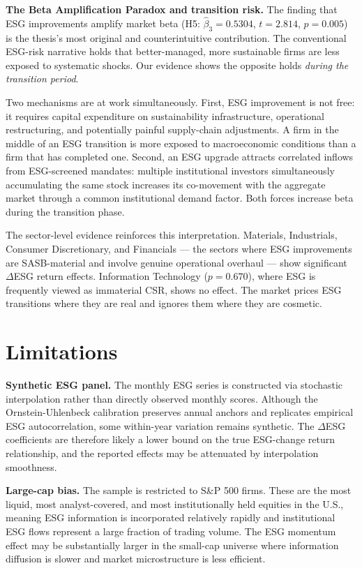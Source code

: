 \textbf{The Beta Amplification Paradox and transition risk.} The finding that ESG improvements amplify market beta (H5: $\hat{\beta}_3=0.5304$, $t=2.814$, $p=0.005$) is the thesis's most original and counterintuitive contribution. The conventional ESG-risk narrative holds that better-managed, more sustainable firms are less exposed to systematic shocks. Our evidence shows the opposite holds \emph{during the transition period}.

Two mechanisms are at work simultaneously. First, ESG improvement is not free: it requires capital expenditure on sustainability infrastructure, operational restructuring, and potentially painful supply-chain adjustments. A firm in the middle of an ESG transition is more exposed to macroeconomic conditions than a firm that has completed one. Second, an ESG upgrade attracts correlated inflows from ESG-screened mandates: multiple institutional investors simultaneously accumulating the same stock increases its co-movement with the aggregate market through a common institutional demand factor. Both forces increase beta during the transition phase.

The sector-level evidence reinforces this interpretation. Materials, Industrials, Consumer Discretionary, and Financials --- the sectors where ESG improvements are SASB-material and involve genuine operational overhaul --- show significant $\Delta$ESG return effects. Information Technology ($p=0.670$), where ESG is frequently viewed as immaterial CSR, shows no effect. The market prices ESG transitions where they are real and ignores them where they are cosmetic.

\section{Limitations}

\textbf{Synthetic ESG panel.} The monthly ESG series is constructed via stochastic interpolation rather than directly observed monthly scores. Although the Ornstein-Uhlenbeck calibration preserves annual anchors and replicates empirical ESG autocorrelation, some within-year variation remains synthetic. The $\Delta$ESG coefficients are therefore likely a lower bound on the true ESG-change return relationship, and the reported effects may be attenuated by interpolation smoothness.

\textbf{Large-cap bias.} The sample is restricted to S\&P 500 firms. These are the most liquid, most analyst-covered, and most institutionally held equities in the U.S., meaning ESG information is incorporated relatively rapidly and institutional ESG flows represent a large fraction of trading volume. The ESG momentum effect may be substantially larger in the small-cap universe where information diffusion is slower and market microstructure is less efficient.

